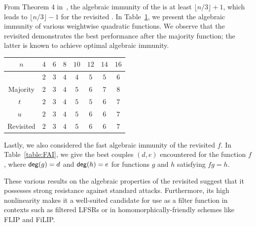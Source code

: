 \documentclass[11pt]{llncs}
\begin{document}
From Theorem 4 in~\cite{DAM:WCST14}, the algebraic immunity of the \hwbf{} is at least $\lfloor n/3\rfloor +1$, which leads to $\lfloor n/3\rfloor -1$ for the revisited \hwbf{}.
In Table~\ref{table:comparisonsAI}, we present the algebraic immunity of various weightwise quadratic functions. We observe that the revisited \hwbf{} demonstrates the best performance after the majority function; the latter is known to achieve optimal algebraic immunity.

\begin{table}[ht]
	\small
	\centering
	\begin{tabular}{|c| c|c|c|c| c|c|c|}
		\hline
		$n$ & $4$  & $6$  & $8$  &  $10$ & $12$ & $14$ & $16$  \\
		\hline	
		\hwbf{}   & $2$  & $3$  & $4$  &  $4$ & $5$ & $5$ & $6$  \\  	
		Majority   & $2$  & $3$  & $4$  &  $5$ & $6$ & $7$ & $8$  \\
		$t$~\cite{DAM:MeaOza24}   & $2$  & $3$  & $4$  &  $5$ & $5$ & $6$ & $7$\\
		$u$~\cite{DAM:MeaOza24}   & $2$  & $3$  & $4$  &  $5$ & $6$ & $6$ & $7$ \\					
		Revisited \hwbf{}   & $2$  & $3$  & $4$  &  $5$ & $6$ & $6$ & $7$\\
		\hline
	\end{tabular}
	\label{table:comparisonsAI}
\end{table}

Lastly, we also considered the fast algebraic immunity of the revisited \hwbf{} $f$. In Table~\ref{table:FAI}, we give the best couples $(d,e)$ encountered for the function $f$, where $\mathsf{deg}(g)=d$ and $\mathsf{deg}(h)=e$ for functions $g$ and $h$ satisfying $fg=h$.

\bigskip

These various results on the algebraic properties of the revisited \hwbf{} suggest that it possesses strong resistance against standard attacks. Furthermore, its high nonlinearity makes it a well-suited candidate for use as a filter function in contexts such as filtered \textsf{LFSR}s or in homomorphically-friendly schemes like \textsf{FLIP} and \textsf{FiLIP}.
\end{document}
